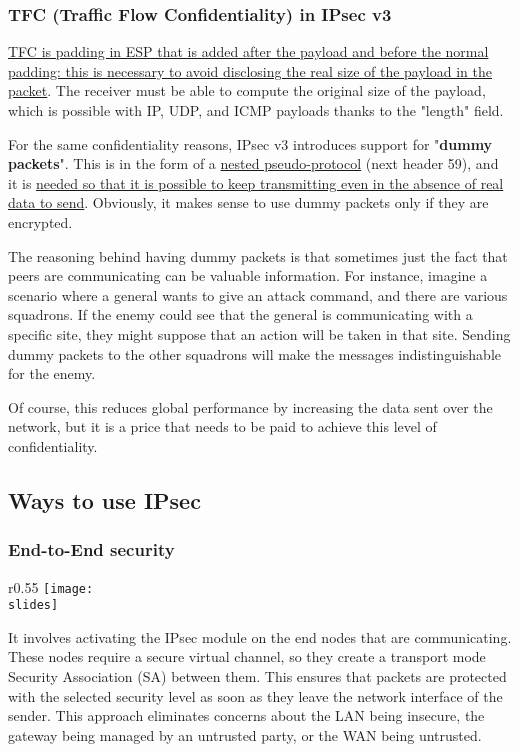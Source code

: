 \subsubsection{TFC (Traffic Flow Confidentiality) in IPsec v3}
\ul{TFC is padding in ESP that is added after the payload and before the normal padding: this is necessary to avoid disclosing the real size of the payload in the packet}. The receiver must be able to compute the original size of the payload, which is possible with IP, UDP, and ICMP payloads thanks to the "length" field.

For the same confidentiality reasons, IPsec v3 introduces support for "\textbf{dummy packets}". This is in the form of a \underline{nested pseudo-protocol} (next header 59), and it is \ul{needed so that it is possible to keep transmitting even in the absence of real data to send}. Obviously, it makes sense to use dummy packets only if they are encrypted.

The reasoning behind having dummy packets is that sometimes just the fact that peers are communicating can be valuable information. For instance, imagine a scenario where a general wants to give an attack command, and there are various squadrons. If the enemy could see that the general is communicating with a specific site, they might suppose that an action will be taken in that site. Sending dummy packets to the other squadrons will make the messages indistinguishable for the enemy.

Of course, this reduces global performance by increasing the data sent over the network, but it is a price that needs to be paid to achieve this level of confidentiality.


\subsection{Ways to use IPsec}
\subsubsection*{End-to-End security}
\begin{wrapfigure}{r}{0.55\textwidth}
    \centering
    \texttt{[image: \\slides]}
\end{wrapfigure}
It involves activating the IPsec module on the end nodes that are communicating. These nodes require a secure virtual channel, so they create a transport mode Security Association (SA) between them. This ensures that packets are protected with the selected security level as soon as they leave the network interface of the sender. This approach eliminates concerns about the LAN being insecure, the gateway being managed by an untrusted party, or the WAN being untrusted.

